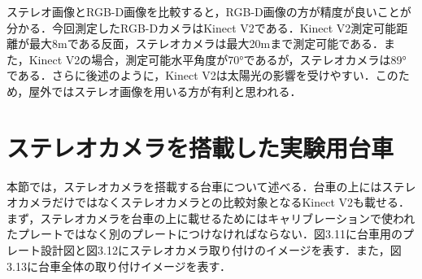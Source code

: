 \newpage

\vspace{5mm}
ステレオ画像とRGB-D画像を比較すると，RGB-D画像の方が精度が良いことが分かる．今回測定したRGB-DカメラはKinect V2である．Kinect V2測定可能距離が最大8mである反面，ステレオカメラは最大20mまで測定可能である．また，Kinect V2の場合，測定可能水平角度が70°であるが，ステレオカメラは89°である．さらに後述のように，Kinect V2は太陽光の影響を受けやすい．このため，屋外ではステレオ画像を用いる方が有利と思われる．

\section{ステレオカメラを搭載した実験用台車}
本節では，ステレオカメラを搭載する台車について述べる．台車の上にはステレオカメラだけではなくステレオカメラとの比較対象となるKinect V2も載せる．まず，ステレオカメラを台車の上に載せるためにはキャリブレーションで使われたプレートではなく別のプレートにつけなければならない．図3.11に台車用のプレート設計図と図3.12にステレオカメラ取り付けのイメージを表す．また，図3.13に台車全体の取り付けイメージを表す．

